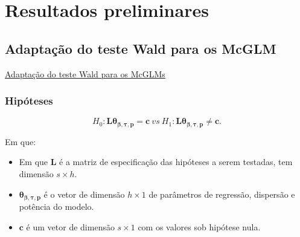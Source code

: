 \documentclass[10pt,
  aspectratio=169,
  serif,
  mathserif,
  professionalfont,
  compress,
  handout,
  ]{beamer}\usepackage[]{graphicx}\usepackage[]{color}
\begin{document}

\section{Resultados preliminares}


\subsection{Adaptação do teste Wald para os McGLM}


\begin{frame}[c, allowframebreaks]

\begin{center}

  {\normalsize \href{https://lineu96.github.io/st/}{Adaptação do teste Wald para os McGLMs}}
  
\end{center}

\end{frame}


\begin{frame}
\frametitle{Hipóteses}

$$H_0: \boldsymbol{L}\boldsymbol{\theta_{\beta,\tau,p}} = \boldsymbol{c} \ vs \ H_1: \boldsymbol{L}\boldsymbol{\theta_{\beta,\tau,p}} \neq \boldsymbol{c}.$$ 

Em que: 

\begin{itemize}
  
  \item Em que $\boldsymbol{L}$ é a matriz de especificação das hipóteses a serem testadas, tem dimensão $s \times h$. 
  
  \item $\boldsymbol{\theta_{\beta,\tau,p}}$ é o vetor de dimensão $h \times 1$ de parâmetros de regressão, dispersão e potência do modelo. 
  
  \item $\boldsymbol{c}$ é um vetor de dimensão $s \times 1$ com os valores sob hipótese nula.

\end{itemize}

\end{frame}
\end{document}
